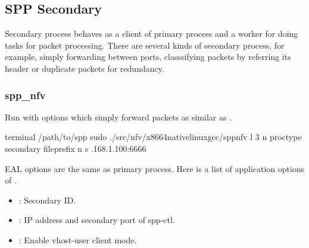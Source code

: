 \documentclass[a4paper,11pt,openany,oneside,english]{sphinxmanual}
\begin{document}
\subsection{SPP Secondary}
\label{\detokenize{gsg/howto_use:spp-secondary}}\label{\detokenize{gsg/howto_use:spp-gsg-howto-sec}}
Secondary process behaves as a client of primary process and a worker
for doing tasks for packet processing. There are several kinds of secondary
process, for example, simply forwarding between ports, classsifying packets
by referring its header or duplicate packets for redundancy.


\subsubsection{spp\_nfv}
\label{\detokenize{gsg/howto_use:spp-nfv}}
Run  with options which simply forward packets as similar
as .

\begin{sphinxVerbatim}[commandchars=\\\{\},formatcom=\footnotesize]
 terminal 
  /path/to/spp
 sudo ./src/nfv/x86\PYGZus{}64\PYGZhy{}native\PYGZhy{}linux\PYGZhy{}gcc/spp\PYGZus{}nfv 
    \PYGZhy{}l \PYGZhy{}3 \PYGZhy{}n  
    \PYGZhy{}\PYGZhy{}proc\PYGZhy{}type secondary 
    \PYGZhy{}\PYGZhy{}file\PYGZhy{}prefix  
    \PYGZhy{}\PYGZhy{} 
    \PYGZhy{}n  
    \PYGZhy{}s .168.1.100:6666
\end{sphinxVerbatim}

EAL options are the same as primary process. Here is a list of application
options of .
\begin{itemize}
\item {} 
: Secondary ID.

\item {} 
: IP address and secondary port of spp-ctl.

\item {} 
: Enable vhost-user client mode.

\end{itemize}
\end{document}
